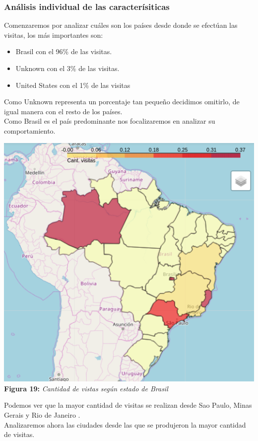 \documentclass[titlepage,a4paper]{article}
\begin{document}
	\subsubsection{Análisis individual de las caracterísiticas}
	Comenzaremos por analizar cuáles son los países desde donde se efectúan las visitas, los más importantes son:
	\begin{itemize}
	\item Brasil con el  96\% de las visitas.
	\item Unknown con el  3\% de las visitas.
	\item United States con el 1\% de las visitas
	\end{itemize}
	Como Unknown representa un porcentaje tan pequeño decidimos omitirlo, de igual manera con el resto de los países. \\
	Como Brasil es el país predominante nos focalizaremos en analizar su comportamiento.
	
	\begin{center}
	\includegraphics[width=15cm] {mapaEstadoBrasil.jpg}\\
	\textbf{Figura 19:}  \textit{Cantidad de vistas según estado de Brasil}
	\end{center}
	Podemos ver que la mayor cantidad de visitas se realizan desde Sao Paulo, 
Minas Gerais  y Rio de Janeiro .\\
	Analizaremos ahora las ciudades desde las que se produjeron la mayor cantidad de visitas.
	
\end{document}

